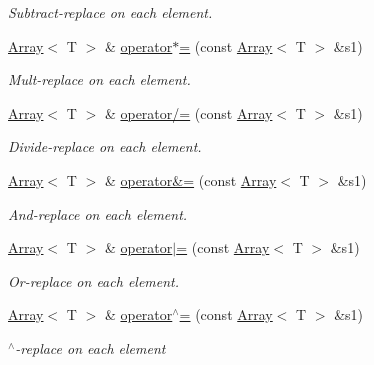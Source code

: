 \begin{DoxyCompactItemize}
\begin{DoxyCompactList}\small\item\em Subtract-\/replace on each element. \end{DoxyCompactList}\item 
\mbox{\hyperlink{classXMLArray_1_1Array}{Array}}$<$ T $>$ \& \mbox{\hyperlink{classXMLArray_1_1Array_a866bd17aae2f3d1935f015a936ce9424}{operator$\ast$=}} (const \mbox{\hyperlink{classXMLArray_1_1Array}{Array}}$<$ T $>$ \&s1)
\begin{DoxyCompactList}\small\item\em Mult-\/replace on each element. \end{DoxyCompactList}\item 
\mbox{\hyperlink{classXMLArray_1_1Array}{Array}}$<$ T $>$ \& \mbox{\hyperlink{classXMLArray_1_1Array_ad729e7678e412fb09104173dbe12a1fc}{operator/=}} (const \mbox{\hyperlink{classXMLArray_1_1Array}{Array}}$<$ T $>$ \&s1)
\begin{DoxyCompactList}\small\item\em Divide-\/replace on each element. \end{DoxyCompactList}\item 
\mbox{\hyperlink{classXMLArray_1_1Array}{Array}}$<$ T $>$ \& \mbox{\hyperlink{classXMLArray_1_1Array_a7a015abc3dfa498a8feb234b51d4c341}{operator\&=}} (const \mbox{\hyperlink{classXMLArray_1_1Array}{Array}}$<$ T $>$ \&s1)
\begin{DoxyCompactList}\small\item\em And-\/replace on each element. \end{DoxyCompactList}\item 
\mbox{\hyperlink{classXMLArray_1_1Array}{Array}}$<$ T $>$ \& \mbox{\hyperlink{classXMLArray_1_1Array_a4a61c5f3146f39c99758bad927e08de7}{operator$\vert$=}} (const \mbox{\hyperlink{classXMLArray_1_1Array}{Array}}$<$ T $>$ \&s1)
\begin{DoxyCompactList}\small\item\em Or-\/replace on each element. \end{DoxyCompactList}\item 
\mbox{\hyperlink{classXMLArray_1_1Array}{Array}}$<$ T $>$ \& \mbox{\hyperlink{classXMLArray_1_1Array_a8e2621caf3277b85e6898a3eceb9b233}{operator$^\wedge$=}} (const \mbox{\hyperlink{classXMLArray_1_1Array}{Array}}$<$ T $>$ \&s1)
\begin{DoxyCompactList}\small\item\em $^\wedge$-\/replace on each element \end{DoxyCompactList}\item 

\end{DoxyCompactItemize}
